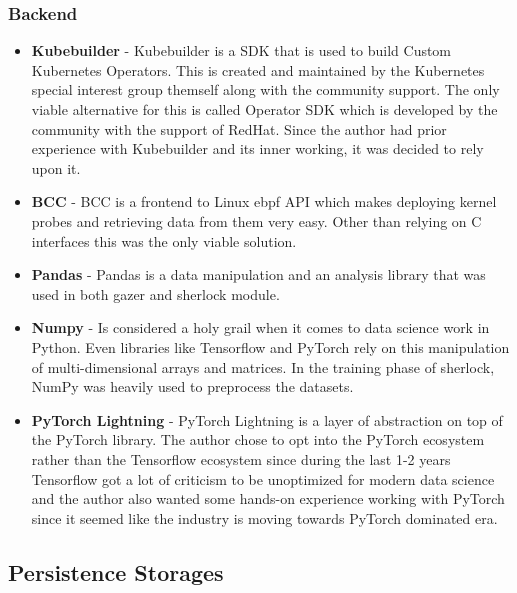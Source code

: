 \subsubsection{Backend}
\begin{itemize}
    \item \textbf{Kubebuilder} - Kubebuilder is a SDK that is used to build Custom Kubernetes Operators. This is created and maintained by the Kubernetes special interest group themself along with the community support. The only viable alternative for this is called Operator SDK which is developed by the community with the support of RedHat. Since the author had prior experience with Kubebuilder and its inner working, it was decided to rely upon it.
    \item \textbf{BCC} - BCC is a frontend to Linux \ac{ebpf} API which makes deploying kernel probes and retrieving data from them very easy. Other than relying on C interfaces this was the only viable solution. 
    \item \textbf{Pandas} - Pandas is a data manipulation and an analysis library that was used in both \ac{gazer} and \ac{sherlock} module.
    \item \textbf{Numpy} - Is considered a holy grail when it comes to data science work in Python. Even libraries like Tensorflow and PyTorch rely on this manipulation of multi-dimensional arrays and matrices. In the training phase of \ac{sherlock}, NumPy was heavily used to preprocess the datasets.
    \item \textbf{PyTorch Lightning} - PyTorch Lightning is a layer of abstraction on top of the PyTorch library. The author chose to opt into the PyTorch ecosystem rather than the Tensorflow ecosystem since during the last 1-2 years Tensorflow got a lot of criticism to be unoptimized for modern data science and the author also wanted some hands-on experience working with PyTorch since it seemed like the industry is moving towards PyTorch dominated era.
\end{itemize}

\subsection{Persistence Storages}

